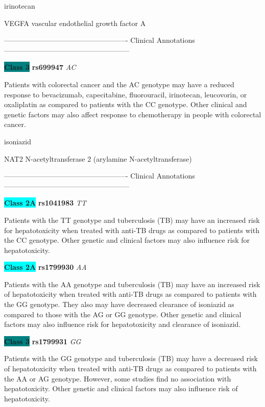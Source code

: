 \documentclass{resume} %
\begin{document}
\begin{rSection}{ irinotecan }
\begin{rSubsection}{ VEGFA }{ vascular endothelial growth factor A }{}{}
\item[] ---------------------------------------------------- Clinical Annotations -----------------------------------------------------\newline
\item \textbf{\colorbox{teal} {Class 3}} \textbf{ rs699947 } \textit{ AC }
\item[] Patients with colorectal cancer and the AC genotype may have a reduced response to bevacizumab, capecitabine, fluorouracil, irinotecan, leucovorin, or oxaliplatin as compared to patients with the CC genotype. Other clinical and genetic factors may also affect response to chemotherapy in people with colorectal cancer.
\end{rSubsection}

\end{rSection}\begin{rSection}{ isoniazid }
\item[]

\begin{rSubsection}{ NAT2 }{ N-acetyltransferase 2 (arylamine N-acetyltransferase) }{}{}
\item[]

\item[] ---------------------------------------------------- Clinical Annotations -----------------------------------------------------\newline
\item \textbf{\colorbox{cyan} {Class 2A}} \textbf{ rs1041983 } \textit{ TT }
\item[] Patients with the TT genotype and tuberculosis (TB) may have an increased risk for hepatotoxicity when treated with anti-TB drugs as compared to patients with the CC genotype. Other genetic and clinical factors may also influence risk for hepatotoxicity.\item \textbf{\colorbox{cyan} {Class 2A}} \textbf{ rs1799930 } \textit{ AA }
\item[] Patients with the AA genotype and tuberculosis (TB) may have an increased risk of hepatotoxicity when treated with anti-TB drugs as compared to patients with the GG genotype. They also may have decreased clearance of isoniazid as compared to those with the AG or GG genotype. Other genetic and clinical factors may also influence risk for hepatotoxicity and clearance of isoniazid.\item \textbf{\colorbox{teal} {Class 3}} \textbf{ rs1799931 } \textit{ GG }
\item[] Patients with the GG genotype and tuberculosis (TB) may have a decreased risk of hepatotoxicity when treated with anti-TB drugs as compared to patients with the AA or AG genotype. However, some studies find no association with hepatotoxicity. Other genetic and clinical factors may also influence risk of hepatotoxicity.
\end{rSubsection}


\end{rSection}
\end{document}
